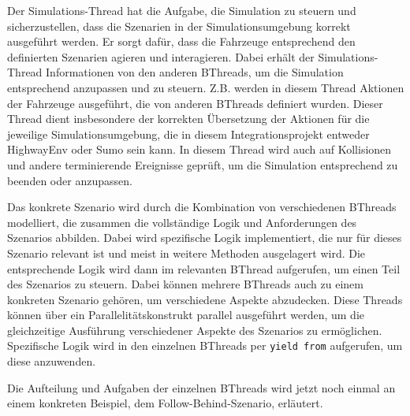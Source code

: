 Der Simulations-Thread hat die Aufgabe, die Simulation zu steuern und sicherzustellen, dass die Szenarien in der Simulationsumgebung korrekt ausgeführt werden. Er sorgt dafür, dass die Fahrzeuge entsprechend den definierten Szenarien agieren und interagieren.
Dabei erhält der Simulations-Thread Informationen von den anderen BThreads, um die Simulation entsprechend anzupassen und zu steuern. Z.B. werden in diesem Thread Aktionen der Fahrzeuge ausgeführt, die von anderen BThreads definiert wurden.
Dieser Thread dient insbesondere der korrekten Übersetzung der Aktionen für die jeweilige Simulationsumgebung, die in diesem Integrationsprojekt entweder HighwayEnv oder Sumo sein kann.
In diesem Thread wird auch auf Kollisionen und andere terminierende Ereignisse geprüft, um die Simulation entsprechend zu beenden oder anzupassen.

Das konkrete Szenario wird durch die Kombination von verschiedenen BThreads modelliert, die zusammen die vollständige Logik und Anforderungen des Szenarios abbilden. Dabei wird spezifische Logik implementiert, die nur für dieses Szenario relevant ist und meist in weitere Methoden ausgelagert wird.
Die entsprechende Logik wird dann im relevanten BThread aufgerufen, um einen Teil des Szenarios zu steuern. Dabei können mehrere BThreads auch zu einem konkreten Szenario gehören, um verschiedene Aspekte abzudecken.
Diese Threads können über ein Parallelitätskonstrukt parallel ausgeführt werden, um die gleichzeitige Ausführung verschiedener Aspekte des Szenarios zu ermöglichen. Spezifische Logik wird in den einzelnen BThreads per \texttt{yield from} aufgerufen, um diese anzuwenden.

Die Aufteilung und Aufgaben der einzelnen BThreads wird jetzt noch einmal an einem konkreten Beispiel, dem Follow-Behind-Szenario, erläutert.
